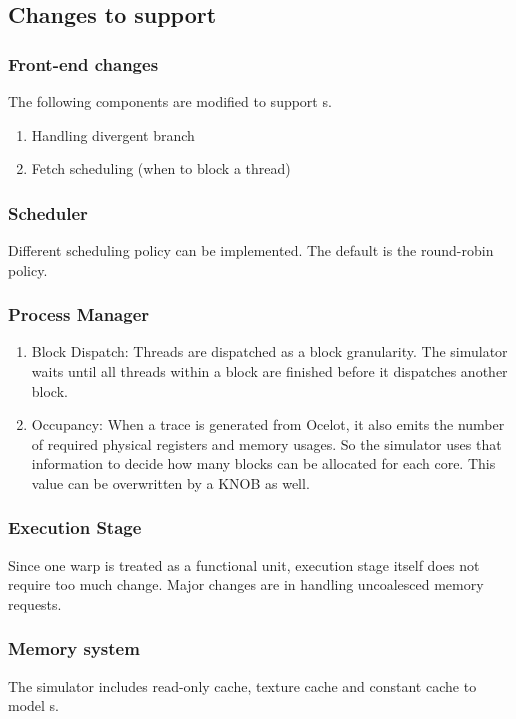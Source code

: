 \ignore 
		{
		\subsection{Changes to support {\gpu}}
		\subsubsection{Front-end changes}
		The following components are modified to support {\gpu}s. 
		\begin{enumerate}
		\item Handling divergent branch
		\item Fetch scheduling (when to block a thread)
		\end{enumerate}
		\subsubsection{Scheduler}
		Different scheduling policy can be implemented. The default is the round-robin policy. 

		\subsubsection{Process Manager}

		\begin{enumerate}
		\item Block Dispatch: Threads are dispatched as a block granularity. 
		The simulator waits until all threads within a block are finished 
		before it dispatches another block. 
		\item Occupancy: When a trace is generated from Ocelot, it also emits the number of required 
		physical registers and memory usages. So the simulator uses that information to decide 
		how many blocks can be allocated for each core. This value can be overwritten by a KNOB as well. 
		\end{enumerate}

		\subsubsection{Execution Stage}
		Since one warp is treated as a functional unit, execution stage itself does not require too much change. Major changes are in handling uncoalesced memory  requests. 

		\subsubsection{Memory system}
		The simulator includes read-only cache, texture cache and constant cache to model {\gpu}s. 
		}


